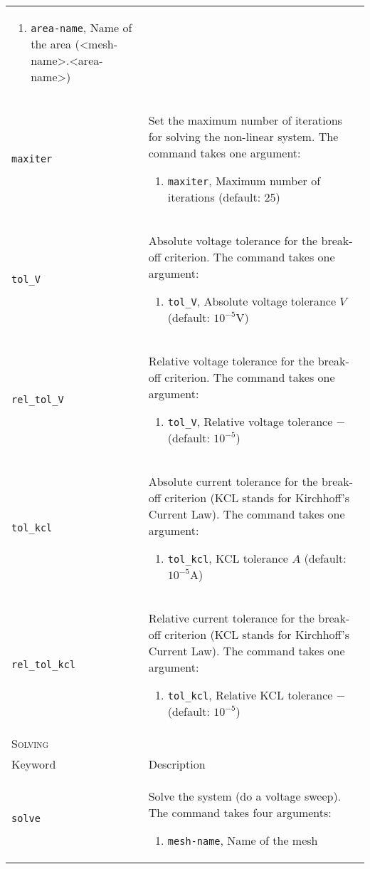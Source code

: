 \documentclass[noshowpacs,preprintnumbers,amsmath,amssymb, letter]{revtex4}
\begin{document}
\begin{longtable}{p{}p{}}
\begin{enumerate}
\item \texttt{area-name}, Name of the area (\textless mesh-name\textgreater .\textless area-name\textgreater )
\end{enumerate}\\
\texttt{maxiter}	&  Set the maximum number of iterations for solving the non-linear system. The command takes one argument:
\begin{enumerate}
\item \texttt{maxiter}, Maximum number of iterations (default: 25)
\end{enumerate}\\
\texttt{tol\_V}	&  Absolute voltage tolerance for the break-off criterion. The command takes one argument:
\begin{enumerate}
\item \texttt{tol\_V}, Absolute voltage tolerance $V$ (default: $10^{-5} \text{V}$)
\end{enumerate}\\
\texttt{rel\_tol\_V}	&  Relative voltage tolerance for the break-off criterion. The command takes one argument:
\begin{enumerate}
\item \texttt{tol\_V}, Relative voltage tolerance $-$ (default: $10^{-5}$)
\end{enumerate}\\
\texttt{tol\_kcl}	&  Absolute current tolerance for the break-off criterion (KCL stands for Kirchhoff's Current Law). The command takes one argument:
\begin{enumerate}
\item \texttt{tol\_kcl}, KCL tolerance $A$ (default: $10^{-5} \text{A}$)
\end{enumerate}\\
\texttt{rel\_tol\_kcl}	&  Relative current tolerance for the break-off criterion (KCL stands for Kirchhoff's Current Law). The command takes one argument:
\begin{enumerate}
\item \texttt{tol\_kcl}, Relative KCL tolerance $-$ (default: $10^{-5}$)
\end{enumerate}\\
\multicolumn{2}{l}{\textsc{Solving}} \\*
\hline
Keyword & Description \\
\texttt{solve}	&  Solve the system (do a voltage sweep). The command takes four arguments:
\begin{enumerate}
\item \texttt{mesh-name}, Name of the mesh

\end{enumerate}
\end{longtable}
\end{document}
